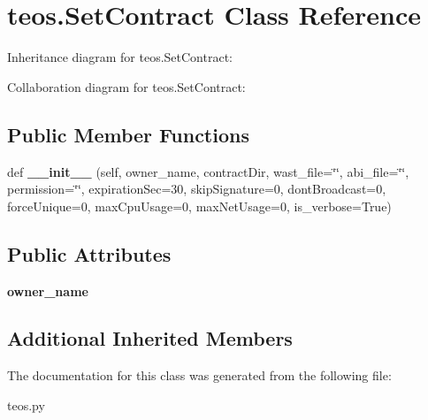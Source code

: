 \hypertarget{classteos_1_1SetContract}{}\section{teos.\+Set\+Contract Class Reference}
\label{classteos_1_1SetContract}


Inheritance diagram for teos.\+Set\+Contract\+:


Collaboration diagram for teos.\+Set\+Contract\+:
\subsection*{Public Member Functions}
\begin{DoxyCompactItemize}
\item 
\mbox{\label{classteos_1_1SetContract_a48140fc266de14c9729efb7fef26813c}} 
def {\bfseries \+\_\+\+\_\+init\+\_\+\+\_\+} (self, owner\+\_\+name, contract\+Dir, wast\+\_\+file=\char`\"{}\char`\"{}, abi\+\_\+file=\char`\"{}\char`\"{}, permission=\char`\"{}\char`\"{}, expiration\+Sec=30, skip\+Signature=0, dont\+Broadcast=0, force\+Unique=0, max\+Cpu\+Usage=0, max\+Net\+Usage=0, is\+\_\+verbose=True)
\end{DoxyCompactItemize}
\subsection*{Public Attributes}
\begin{DoxyCompactItemize}
\item 
\mbox{\label{classteos_1_1SetContract_aa12e20efeb12842d5c38bedb10cdc576}} 
{\bfseries owner\+\_\+name}
\end{DoxyCompactItemize}
\subsection*{Additional Inherited Members}


The documentation for this class was generated from the following file\+:\begin{DoxyCompactItemize}
\item 
teos.\+py\end{DoxyCompactItemize}
